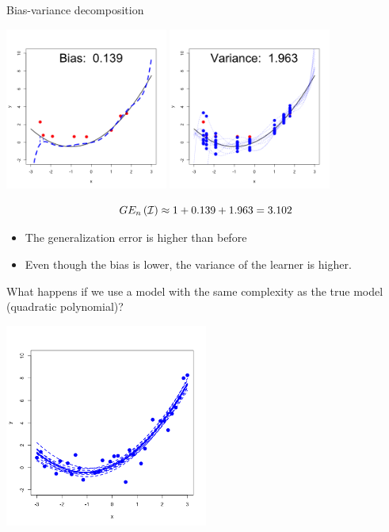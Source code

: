 \documentclass[11pt,compress,t,notes=noshow, xcolor=table]{beamer}
\begin{document}
\begin{vbframe} {Bias-variance decomposition}
\framebreak

\begin{center}
  \includegraphics[width = 0.4\textwidth]{figure/bias_variance_decomposition-complex_model_bias.png}
  \includegraphics[width = 0.4\textwidth]{figure/bias_variance_decomposition-complex_model_variance.png}
\end{center}

$$GE_n\left(\mathcal{I}\right) \approx 1 + 0.139 + 1.963 = 3.102 $$

\begin{itemize}
  \item The generalization error is higher than before
  \item Even though the bias is lower, the variance of the learner is higher. 
\end{itemize}



\framebreak

What happens if we use a model with the same complexity as the true model (quadratic polynomial)? 

\begin{center}
  \includegraphics[width = 0.5\textwidth]{figure/bias_variance_decomposition-correct_model.png}
\end{center}


\end{vbframe}
\end{document}

